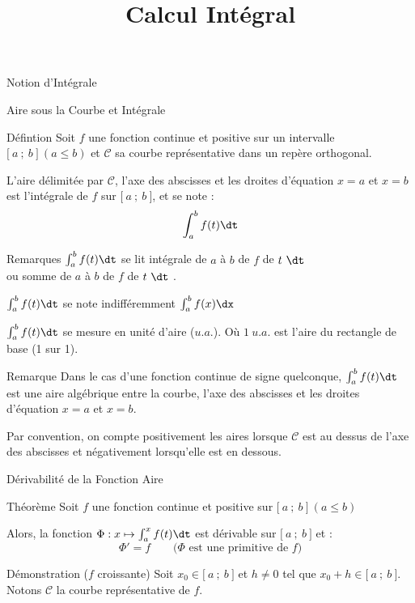 \documentclass{cours}
\title{Calcul Intégral}
\begin{document}
    
    \begin{Gpartie}{Notion d'Intégrale} 
        \begin{Spartie}{Aire sous la Courbe et Intégrale} 
            \begin{SSpartie}{Défintion} 
                Soit $f$ une fonction continue et positive sur un intervalle $\big[~a~;~b~\big]~\left(a\leq b\right)$ et $\mathcal{C}$ sa courbe représentative dans un repère orthogonal.

                L'aire délimitée par $\mathcal{C}$, l'axe des abscisses et les droites d'équation $x=a$ et $x=b$ est l'intégrale de $f$ sur $\big[~a~;~b~\big]$, et se note : \[\int_a^b f(t)\dt\]
            \end{SSpartie}
            \begin{SSpartie}{Remarques} 
                $\int_a^b f(t)\dt$ se lit \og intégrale de $a$ à $b$ de $f$ de $t~\dt$ \fg{} \\ ou \og somme de $a$ à $b$ de $f$ de $t~\dt$ \fg{}.

                $\int_a^b f(t)\dt$ se note indifféremment $\int_a^b f(x)\dx$

                $\int_a^b f(t)\dt$ se mesure en unité d'aire ($u.a.$). Où $1~u.a.$ est l'aire du rectangle de base (1 sur 1).
            \end{SSpartie}
            \begin{SSpartie}{Remarque} 
                Dans le cas d'une fonction continue de signe quelconque, $\int_a^b f(t)\dt$ est une aire algébrique entre la courbe, l'axe des abscisses et les droites d'équation $x=a$ et $x=b$.

                Par convention, on compte positivement les aires lorsque $\mathcal{C}$ est au dessus de l'axe des abscisses et négativement lorsqu'elle est en dessous.
            \end{SSpartie}
        \end{Spartie}
        \pagebreak
        \begin{Spartie}{Dérivabilité de la Fonction Aire} 
            \begin{SSpartie}{Théorème} 
                Soit $f$ une fonction continue et positive sur $\big[~a~;~b~\big]~\left(a\leq b\right)$

                Alors, la fonction $\Phi:x\mapsto\int_a^xf(t)\dt$ est dérivable sur $\big[~a~;~b~\big]$ et : \[\Phi'=f\qquad\text{($\Phi$ est une primitive de $f$)}\]
                \begin{SSSpartie}{Démonstration \big($f$ croissante\big)} 
                    Soit $x_0\in\big[~a~;~b~\big]$ et $h\neq 0$ tel que $x_0+h\in\big[~a~;~b~\big]$. Notons $\mathcal{C}$ la courbe représentative de $f$.


\end{SSSpartie}
\end{SSpartie}
\end{Spartie}
\end{Gpartie}
\end{document}
